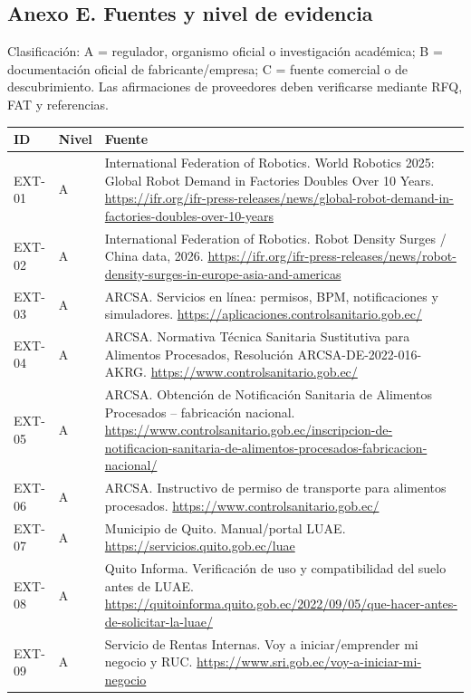 \documentclass[11pt,a4paper]{article}
\begin{document}
\subsection*{Anexo E. Fuentes y nivel de evidencia}
Clasificación: A = regulador, organismo oficial o investigación académica; B = documentación oficial de
fabricante/empresa; C = fuente comercial o de descubrimiento. Las afirmaciones de proveedores deben
verificarse mediante RFQ, FAT y referencias.

{\small
\begin{xltabular}{\textwidth}{@{}P{1.4cm}P{1cm}L@{}}
\toprule
\textbf{ID} & \textbf{Nivel} & \textbf{Fuente}\\ \midrule
\endhead
EXT-01 & A & International Federation of Robotics. World Robotics 2025: Global Robot Demand in Factories Doubles Over 10 Years. \url{https://ifr.org/ifr-press-releases/news/global-robot-demand-in-factories-doubles-over-10-years}\\
EXT-02 & A & International Federation of Robotics. Robot Density Surges / China data, 2026. \url{https://ifr.org/ifr-press-releases/news/robot-density-surges-in-europe-asia-and-americas}\\
EXT-03 & A & ARCSA. Servicios en línea: permisos, BPM, notificaciones y simuladores. \url{https://aplicaciones.controlsanitario.gob.ec/}\\
EXT-04 & A & ARCSA. Normativa Técnica Sanitaria Sustitutiva para Alimentos Procesados, Resolución ARCSA-DE-2022-016-AKRG. \url{https://www.controlsanitario.gob.ec/}\\
EXT-05 & A & ARCSA. Obtención de Notificación Sanitaria de Alimentos Procesados -- fabricación nacional. \url{https://www.controlsanitario.gob.ec/inscripcion-de-notificacion-sanitaria-de-alimentos-procesados-fabricacion-nacional/}\\
EXT-06 & A & ARCSA. Instructivo de permiso de transporte para alimentos procesados. \url{https://www.controlsanitario.gob.ec/}\\
EXT-07 & A & Municipio de Quito. Manual/portal LUAE. \url{https://servicios.quito.gob.ec/luae}\\
EXT-08 & A & Quito Informa. Verificación de uso y compatibilidad del suelo antes de LUAE. \url{https://quitoinforma.quito.gob.ec/2022/09/05/que-hacer-antes-de-solicitar-la-luae/}\\
EXT-09 & A & Servicio de Rentas Internas. Voy a iniciar/emprender mi negocio y RUC. \url{https://www.sri.gob.ec/voy-a-iniciar-mi-negocio}\\

\end{xltabular}}
\end{document}
